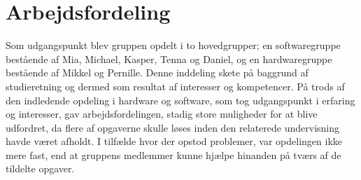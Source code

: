
\section{Arbejdsfordeling}
Som udgangspunkt blev gruppen opdelt i to hovedgrupper; en softwaregruppe bestående af Mia, Michael, Kasper, Tenna og Daniel, og en hardwaregruppe bestående af Mikkel og Pernille. Denne inddeling skete på baggrund af studieretning og dermed som resultat af interesser og kompetencer. På trods af den indledende opdeling i hardware og software, som tog udgangspunkt i erfaring og interesser, gav arbejdsfordelingen, stadig store muligheder for at blive udfordret, da flere af opgaverne skulle løses inden den relaterede undervisning havde været afholdt. I tilfælde hvor der opstod problemer, var opdelingen ikke mere fast, end at gruppens medlemmer kunne hjælpe hinanden på tværs af de tildelte opgaver. \\


